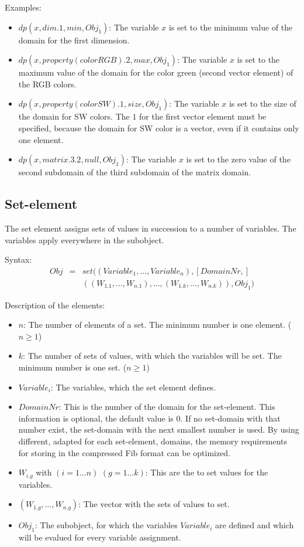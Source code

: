 \bigskip\noindent
Examples:
\begin{itemize}
 \item $dp( x , dim.1, min, Obj_1 )$: The variable $x$ is set to the minimum value of the domain for the first dimension.
 \item $dp( x , property( colorRGB).2, max, Obj_1 )$: The variable $x$ is set to the maximum value of the domain for the color green (second vector element) of the RGB colors.
 \item $dp( x , property( colorSW).1, size, Obj_1 )$: The variable $x$ is set to the size of the domain for SW colors. The $1$ for the first vector element must be specified, because the domain for SW color is a vector, even if it contains only one element.
 \item $dp( x , matrix.3.2, null, Obj_1 )$: The variable $x$ is set to the zero value of the second subdomain of the third subdomain of the matrix domain.
\end{itemize}



\subsection{Set-element}
\label{secFibSetElement}

\bigskip\noindent
The set element assigns sets of values in succession to a number of variables. The variables apply everywhere in the subobject.

\bigskip\noindent
Syntax:
\begin{eqnarray*}
Obj &=& set( (Variable_1, \ldots, Variable_n), [DomainNr,]\\
&& ( (W_{1.1}, \ldots, W_{n.1}), \ldots,(W_{1.k}, \ldots, W_{n.k}) ), Obj_1)
\end{eqnarray*}

\bigskip\noindent
Description of the elements:
\begin{itemize}
 \item $n$: The number of elements of a set. The minimum number is one element. ($n \geq 1$)
 \item $k$: The number of sets of values, with which the variables will be set. The minimum number is one set. ($n \geq 1$)
 \item $Variable_i$:  The variables, which the set element defines.
 \item $DomainNr$: This is the number of the domain for the set-element. This information is optional, the default value is 0. If no set-domain with that number exist, the set-domain with the next smallest number is used. By using different, adapted for each set-element, domains, the memory requirements for storing in the compressed Fib format can be optimized.
 \item $W_{i.g}$ with $(i = 1 \ldots n)$ $(g = 1 \ldots k)$: This are the to set values for the variables.
 \item $(W_{1.g}, \ldots, W_{n.g})$: The vector with the sets of values to set.
 \item $Obj_1$: The subobject, for which the variables $Variable_i$ are defined and which will be evalued for every variable assignment.
\end{itemize}

